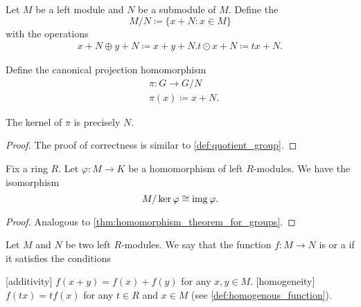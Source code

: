 \begin{definition}\label{def:quotient_left_module}
  Let \( M \) be a left module and \( N \) be a submodule of \( M \). Define the 
  \begin{equation*}
    M / N \coloneqq \{ x + N \colon x \in M \}
  \end{equation*}
  with the operations
  \begin{align*}
    x + N \oplus y + N \coloneqq x + y + N.
    t \odot x + N \coloneqq tx + N.
  \end{align*}

  Define the canonical projection homomorphism
  \begin{align*}
    &\pi: G \to G / N \\
    &\pi(x) \coloneqq x + N.
  \end{align*}

  The kernel of \( \pi \) is precisely \( N \).
\end{definition}
\begin{proof}
  The proof of correctness is similar to \cref{def:quotient_group}.
\end{proof}

\begin{theorem}\label{thm:homomorphism_theorem_for_left_modules}
  Fix a ring \( R \). Let \( \varphi: M \to K \) be a homomorphism of left \( R \)-modules. We have the isomorphism
  \begin{equation*}
    M / \ker \varphi \cong \operatorname{img} \varphi.
  \end{equation*}
\end{theorem}
\begin{proof}
  Analogous to \cref{thm:homomorphism_theorem_for_groups}.
\end{proof}

\begin{definition}\label{def:linear_operator}
  Let \( M \) and \( N \) be two left \( R \)-modules. We say that the function \( f: M \to N \) is  or a  if it satisfies the conditions
  \begin{description}
    [additivity] \( f(x + y) = f(x) + f(y) \) for any \( x, y \in M \).
    [homogeneity] \( f(tx) = t f(x) \) for any \( t \in R \) and \( x \in M \) (see \cref{def:homogenous_function}).
  \end{description}
\end{definition}

